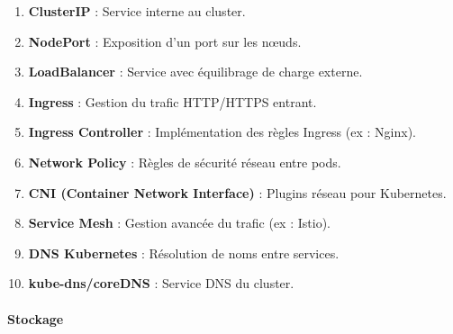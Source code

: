 \documentclass[
  letterpaper,
  DIV=11,
  numbers=noendperiod]{scrartcl}
\makeatletter
\let\oldparagraph\paragraph
\renewcommand{\paragraph}{
    \@ifstar
      \xxxParagraphStar
      \xxxParagraphNoStar
  }
\newcommand{\xxxParagraphStar}[1]{\oldparagraph*{#1}\mbox{}}
\newcommand{\xxxParagraphNoStar}[1]{\oldparagraph{#1}\mbox{}}
\providecommand{\tightlist}{%
  \setlength{\itemsep}{0pt}\setlength{\parskip}{0pt}}\usepackage{longtable,booktabs,array}
\makeatother
\begin{document}
\begin{enumerate}
\def\labelenumi{\arabic{enumi}.}
\setcounter{enumi}{30}
\tightlist
\item
  \textbf{ClusterIP} : Service interne au cluster.\\
\item
  \textbf{NodePort} : Exposition d'un port sur les nœuds.\\
\item
  \textbf{LoadBalancer} : Service avec équilibrage de charge externe.\\
\item
  \textbf{Ingress} : Gestion du trafic HTTP/HTTPS entrant.\\
\item
  \textbf{Ingress Controller} : Implémentation des règles Ingress (ex :
  Nginx).\\
\item
  \textbf{Network Policy} : Règles de sécurité réseau entre pods.\\
\item
  \textbf{CNI (Container Network Interface)} : Plugins réseau pour
  Kubernetes.\\
\item
  \textbf{Service Mesh} : Gestion avancée du trafic (ex : Istio).\\
\item
  \textbf{DNS Kubernetes} : Résolution de noms entre services.\\
\item
  \textbf{kube-dns/coreDNS} : Service DNS du cluster.
\end{enumerate}

\paragraph{\texorpdfstring{\textbf{Stockage}}{Stockage}}\label{stockage}
\end{document}
